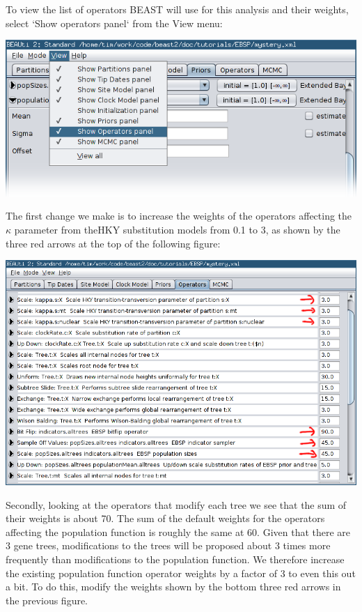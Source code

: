 \documentclass[a4paper,11pt]{article}
\begin{document}
To view the list of operators BEAST will use for this analysis and their
weights, select `Show operators panel` from the View menu:

\includegraphics[width=\textwidth]{figures/view_operators.png}

The first change we make is to increase the weights of the operators affecting
the $\kappa$ parameter from theHKY substitution models from 0.1 to 3, as shown
by the three red arrows at the top of the following figure:

\includegraphics[width=\textwidth]{figures/operators.png}

Secondly, looking at the operators that modify each tree we see that the sum of
their weights is about 70. The sum of the default weights for the operators
affecting the population function is roughly the same at 60. Given that there
are 3 gene trees, modifications to the trees will be proposed about 3 times
more frequently than modifications to the population function.  We therefore
increase the existing population function operator weights by a factor of 3 to
even this out a bit.  To do this, modify the weights shown by the bottom three
red arrows in the previous figure.
\end{document}
